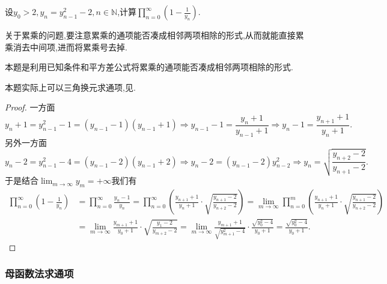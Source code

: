 \documentclass[../../main.tex]{subfiles}
\begin{document}
\begin{example}
设\(y_0>2,y_n=y_{n - 1}^{2}-2,n\in\mathbb{N}\),计算\(\prod_{n = 0}^{\infty}(1 - \frac{1}{y_n})\).  
\end{example}
\begin{note}
关于累乘的问题,要注意累乘的通项能否凑成相邻两项相除的形式,从而就能直接累乘消去中间项,进而将累乘号去掉.

本题是利用已知条件和平方差公式将累乘的通项能否凑成相邻两项相除的形式.
\end{note}
\begin{remark}
本题实际上可以三角换元求通项,见.
\end{remark}
\begin{proof}
一方面
\[
y_n + 1=y_{n - 1}^{2}-1=(y_{n - 1}-1)(y_{n - 1}+1)\Rightarrow y_{n - 1}-1=\frac{y_n + 1}{y_{n - 1}+1}\Rightarrow y_n - 1=\frac{y_{n + 1}+1}{y_n + 1}.
\]
另外一方面
\[
y_n - 2=y_{n - 1}^{2}-4=(y_{n - 1}-2)(y_{n - 1}+2)\Rightarrow y_n - 2=(y_{n - 1}-2)y_{n - 2}^{2}\Rightarrow y_n=\sqrt{\frac{y_{n + 2}-2}{y_{n + 1}-2}}.
\]
于是结合\(\lim_{m\rightarrow\infty}y_m = +\infty\)我们有
\begin{align*}
\prod_{n = 0}^{\infty}\left(1-\frac{1}{y_n}\right)&=\prod_{n=0}^{\infty}{\frac{y_n-1}{y_n}}=\prod_{n = 0}^{\infty}\left(\frac{y_{n + 1}+1}{y_n + 1}\cdot\sqrt{\frac{y_{n + 1}-2}{y_{n + 2}-2}}\right)
=\lim_{m\rightarrow\infty}\prod_{n = 0}^{m}\left(\frac{y_{n + 1}+1}{y_n + 1}\cdot\sqrt{\frac{y_{n + 1}-2}{y_{n + 2}-2}}\right)\\
&=\lim_{m\rightarrow\infty}\frac{y_{m + 1}+1}{y_0 + 1}\cdot\sqrt{\frac{y_1 - 2}{y_{m + 2}-2}}
=\lim_{m\rightarrow\infty}\frac{y_{m + 1}+1}{\sqrt{y_{m + 1}^{2}-4}}\cdot\frac{\sqrt{y_0^{2}-4}}{y_0 + 1}
=\frac{\sqrt{y_0^{2}-4}}{y_0 + 1}.
\end{align*}

\end{proof}





\subsubsection{母函数法求通项}
\end{document}
